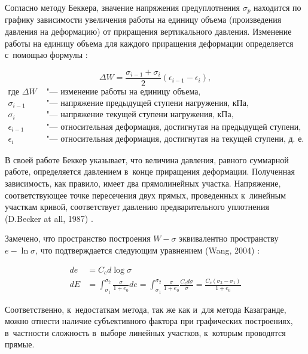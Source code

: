 Согласно методу Беккера, значение напряжения предуплотнения $\sigma_p$ находится по графику зависимости увеличения работы на единицу объема (произведения давления на деформацию) от приращения вертикального давления.
Изменение работы на единицу объема для каждого приращения деформации определяется с~помощью формулы \cite{becker1987}:

\begin{equation}
  \label{eq:deltaw}
  \Delta W = \frac{\sigma_{i-1} + \sigma_i}{2} (\epsilon_{i-1} - \epsilon_i),
\end{equation}
\begin{align*}
  \text{где }
  \Delta W & 
  \text{ "--- изменение работы на единицу объема,} \\
  \sigma_{i-1} & 
  \text{ "--- напряжение предыдущей ступени нагружения, кПа,} \\
  \sigma_i & 
  \text{ "--- напряжение текущей ступени нагружения, кПа,} \\
  \epsilon_{i-1} & 
  \text{ "--- относительная деформация, достигнутая на предыдущей ступени, д.~е.,} \\
  \epsilon_i & 
  \text{ "--- относительная деформация, достигнутая на текущей ступени, д.~е.}
\end{align*}

В своей работе Беккер указывает, что величина давления, равного суммарной работе, определяется давлением в~конце приращения деформации. 
Полученная зависимость, как правило, имеет два прямолинейных участка. 
Напряжение, соответствующее точке пересечения двух прямых, проведенных к~линейным участкам кривой, соответствует давлению предварительного уплотнения (D.Becker at all, 1987) \cite{becker1987}.

Замечено, что пространство построения $W - \sigma$ эквивалентно пространству $e - \ln \sigma$, что подтверждается следующим уравнением (Wang, 2004) \cite{wang2004}: 


\begin{subequations}
  \label{eq:Maxwell}
  \begin{align}
    \label{eq:eqw_1}
    de & = C_c d \log\sigma \\
    \label{eq:eqw_2}
    dE & = \int_{\sigma_1}^{\sigma_2} \frac{\sigma}{1+e_0} de 
    = \int_{\sigma_1}^{\sigma_2} \frac{\sigma}{1+e_0} \frac{C_c d\sigma}{\sigma}
    = \frac{C_c (\sigma_2-\sigma_1)}{1+e_0}
  \end{align}
\end{subequations}

Соответственно, к~недостаткам метода, так же как и~для метода Казагранде, можно отнести наличие субъективного фактора при графических построениях, в~частности сложность в~выборе линейных участков, к~которым проводятся прямые.


 
